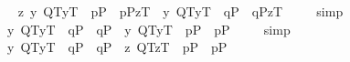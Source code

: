 \begin{isabellebody}
\ \isamarkupfalse%
\ {\isachardoublequoteopen}{\isacharbrackleft}{\isacharparenleft}\isactrlbold {\isasymforall}z{\isachardot}\ {\isasymlparr}{\isacharparenleft}\isactrlbold {\isasymlambda}y{\isachardot}\ {\isacharparenleft}{\isasymlparr}Q\isactrlsup T{\isacharcomma}y\isactrlsup T{\isasymrparr}\ \isactrlbold {\isasymand}\ {\isacharparenleft}p\isactrlsup P\ \isactrlbold {\isasymor}\ \isactrlbold {\isasymnot}p\isactrlsup P{\isacharparenright}{\isacharparenright}{\isacharparenright}{\isacharcomma}z\isactrlsup T{\isasymrparr}\ \isactrlbold {\isasymequiv}\ {\isasymlparr}{\isacharparenleft}\isactrlbold {\isasymlambda}y{\isachardot}\ {\isacharparenleft}{\isasymlparr}Q\isactrlsup T{\isacharcomma}y\isactrlsup T{\isasymrparr}\ \isactrlbold {\isasymand}\ {\isacharparenleft}q\isactrlsup P\ \isactrlbold {\isasymor}\ \isactrlbold {\isasymnot}q\isactrlsup P{\isacharparenright}{\isacharparenright}{\isacharparenright}{\isacharcomma}z\isactrlsup T{\isasymrparr}{\isacharparenright}{\isacharbrackright}\ {\isacharequal}\ {\isasymtop}{\isachardoublequoteclose}%
\isadelimproof
\ %
\endisadelimproof
%
\isatagproof
{}\isamarkupfalse%
\ simp\ \isamarkupfalse%
%
\endisatagproof
{\isafoldproof}%
%
\isadelimproof
%
\endisadelimproof
\isanewline
\isanewline
\ \isamarkupfalse%
\ {\isachardoublequoteopen}{\isacharbrackleft}{\isacharparenleft}\isactrlbold {\isasymlambda}y{\isachardot}\ {\isacharparenleft}{\isasymlparr}Q\isactrlsup T{\isacharcomma}y\isactrlsup T{\isasymrparr}\ \isactrlbold {\isasymand}\ {\isacharparenleft}q\isactrlsup P\ \isactrlbold {\isasymor}\ \isactrlbold {\isasymnot}q\isactrlsup P{\isacharparenright}{\isacharparenright}{\isacharparenright}\ \isactrlbold {\isacharequal}\ {\isacharparenleft}\isactrlbold {\isasymlambda}y{\isachardot}\ {\isacharparenleft}{\isasymlparr}Q\isactrlsup T{\isacharcomma}y\isactrlsup T{\isasymrparr}\ \isactrlbold {\isasymand}\ {\isacharparenleft}p\isactrlsup P\ \isactrlbold {\isasymor}\ \isactrlbold {\isasymnot}p\isactrlsup P{\isacharparenright}{\isacharparenright}{\isacharparenright}{\isacharbrackright}\ {\isacharequal}\ {\isasymtop}{\isachardoublequoteclose}%
\isadelimproof
\ %
\endisadelimproof
%
\isatagproof
{}\isamarkupfalse%
\ simp\ \isamarkupfalse%
%
\endisatagproof
{\isafoldproof}%
%
\isadelimproof
%
\endisadelimproof
\isanewline
\ \isamarkupfalse%
\ {\isachardoublequoteopen}{\isacharbrackleft}{\isacharparenleft}\isactrlbold {\isasymlambda}y{\isachardot}\ {\isacharparenleft}{\isasymlparr}Q\isactrlsup T{\isacharcomma}y\isactrlsup T{\isasymrparr}\ \isactrlbold {\isasymand}\ {\isacharparenleft}q\isactrlsup P\ \isactrlbold {\isasymor}\ \isactrlbold {\isasymnot}q\isactrlsup P{\isacharparenright}{\isacharparenright}{\isacharparenright}\ \isactrlbold {\isacharequal}\ {\isacharparenleft}\isactrlbold {\isasymlambda}z{\isachardot}\ {\isacharparenleft}{\isasymlparr}Q\isactrlsup T{\isacharcomma}z\isactrlsup T{\isasymrparr}\ \isactrlbold {\isasymand}\ {\isacharparenleft}p\isactrlsup P\ \isactrlbold {\isasymor}\ \isactrlbold {\isasymnot}p\isactrlsup P{\isacharparenright}{\isacharparenright}{\isacharparenright}{\isacharbrackright}\ {\isacharequal}\ {\isasymtop}{\isachardoublequoteclose}%

\end{isabellebody}
